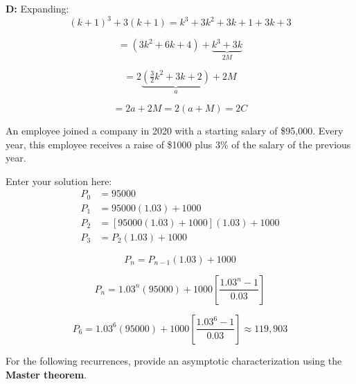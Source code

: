 \documentclass[10pt]{exam}
\begin{document}
\begin{questions}
\begin{solution}
    \textbf{D:} Expanding:
    \[(k+1)^3 + 3(k+1) = k^3 + 3k^2 + 3k + 1 + 3k + 3\]
    
    \[= (3k^2 + 6k + 4) + \underbrace{k^3 + 3k}_{2M}\]
    
    \[= 2\!\underbrace{\left(\tfrac{3}{2}k^2 + 3k + 2\right)}_{a} + 2M\]
    
    \[= 2a + 2M = 2(a + M) = 2C\]
\end{solution}

\question[8]  An employee joined a company in 2020 with a starting salary of \$95,000. Every year, this employee receives a raise of \$1000 plus 3\% of the salary of the previous year.


\begin{solution}
    Enter your solution here:\\
    \begin{align*}
    P_0 &= 95000 \\
    P_1 &= 95000(1.03) + 1000 \\
    P_2 &= [95000(1.03) + 1000](1.03) + 1000 \\
    P_3 &= P_2(1.03) + 1000
    \end{align*}
    
    \[P_n = P_{n-1}(1.03) + 1000\]
    
    \[P_n = 1.03^n(95000) + 1000\left[\frac{1.03^n - 1}{0.03}\right]\]
    
    \[P_6 = 1.03^6(95000) + 1000\left[\frac{1.03^6 - 1}{0.03}\right]\approx 119{,}903\]
\end{solution}



\question[12] For the following recurrences, provide an asymptotic characterization using the \textbf{Master theorem}. 


\end{questions}
\end{document}
